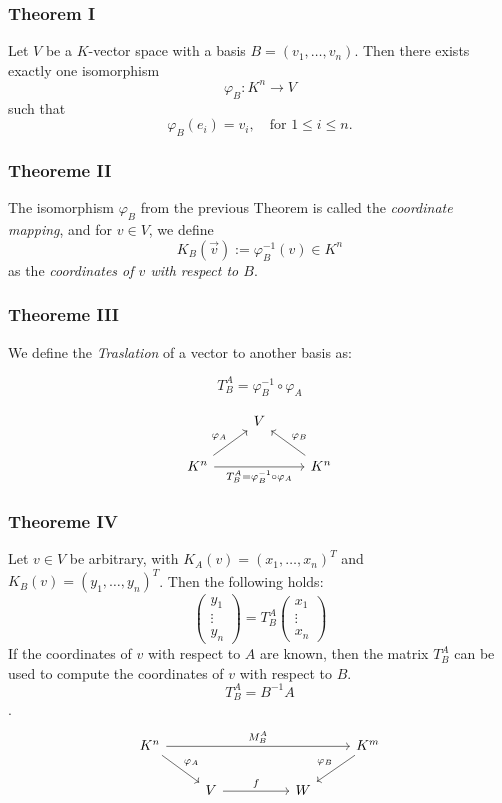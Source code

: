 \subsubsection*{Theorem I} 

Let \( V \) be a \( K \)-vector space with a 
basis \( B = (v_1, \ldots, v_n) \).  
Then there exists exactly one isomorphism 
\[
\varphi_B : K^n \to V
\]
such that
\[
\varphi_B(e_i) = v_i, \quad \text{for } 1 \leq i \leq n.
\]

\subsubsection*{Theoreme II} 

The isomorphism \( \varphi_B \) from the previous 
Theorem is called the \emph{coordinate mapping},  
and for \( v \in V \), we define
\[
K_B (\vec{v}) := \varphi_B^{-1} (v) \in K^n
\]
as the \emph{coordinates of \( v \) with respect to \( B \)}.

\subsubsection*{Theoreme III} We define the \emph{Traslation} of a vector to another
basis as:

\[
T_{B}^{A} = \varphi_{B}^{-1} \circ \varphi_A
\]

\[
\begin{tikzcd}
& V & \\
K^n \arrow[ur, "\varphi_A"] \arrow[rr, "T_{B}^{A} = \varphi_B^{-1} \circ \varphi_A"'] & & K^n \arrow[ul, "\varphi_B"']
\end{tikzcd}
\]

\subsubsection*{Theoreme IV} 

Let \( v \in V \) be arbitrary, 
with \( K_A(v) = (x_1, \ldots, x_n)^T \) 
and \( K_B(v) = (y_1, \ldots, y_n)^T \).  
Then the following holds:
\[
\begin{pmatrix}
y_1 \\
\vdots \\
y_n
\end{pmatrix}
=
T_B^A
\begin{pmatrix}
x_1 \\
\vdots \\
x_n
\end{pmatrix}
\]
If the coordinates of \( v \) with respect to \( A \) are known, then the matrix \( T_B^A \) can be used to compute the coordinates of \( v \) with respect to \( B \).
\[ T_B^A = B^{-1}A \].
\[
    \begin{tikzcd}
        K^n \arrow[rrrr, "M_{B}^{A}"] \arrow[rd, "\varphi_A"] &                   &  &   & K^m \arrow[ld, "\varphi_B"'] \\
                                                              & V \arrow[rr, "f"] &  & W &                             
        \end{tikzcd}
\]

